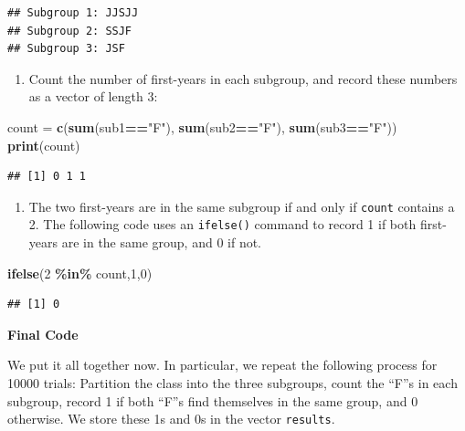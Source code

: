 \documentclass[
]{book}
\newenvironment{Shaded}{\begin{snugshade}}{\end{snugshade}}
\newcommand{\DecValTok}[1]{\textcolor[rgb]{0.00,0.00,0.81}{#1}}
\newcommand{\FunctionTok}[1]{\textcolor[rgb]{0.13,0.29,0.53}{\textbf{#1}}}
\newcommand{\NormalTok}[1]{#1}
\newcommand{\OtherTok}[1]{\textcolor[rgb]{0.56,0.35,0.01}{#1}}
\newcommand{\SpecialCharTok}[1]{\textcolor[rgb]{0.81,0.36,0.00}{\textbf{#1}}}
\newcommand{\StringTok}[1]{\textcolor[rgb]{0.31,0.60,0.02}{#1}}
\providecommand{\tightlist}{%
  \setlength{\itemsep}{0pt}\setlength{\parskip}{0pt}}
\theoremstyle{definition}
\theoremstyle{definition}
\theoremstyle{definition}
\theoremstyle{definition}
\theoremstyle{remark}
\begin{document}
\begin{verbatim}
## Subgroup 1: JJSJJ
## Subgroup 2: SSJF
## Subgroup 3: JSF
\end{verbatim}

\begin{enumerate}
\def\labelenumi{\arabic{enumi}.}
\setcounter{enumi}{2}
\tightlist
\item
  Count the number of first-years in each subgroup, and record these numbers as a vector of length 3:
\end{enumerate}

\begin{Shaded}
\begin{Highlighting}[]
\NormalTok{count }\OtherTok{=} \FunctionTok{c}\NormalTok{(}\FunctionTok{sum}\NormalTok{(sub1}\SpecialCharTok{==}\StringTok{"F"}\NormalTok{),}
            \FunctionTok{sum}\NormalTok{(sub2}\SpecialCharTok{==}\StringTok{"F"}\NormalTok{),}
            \FunctionTok{sum}\NormalTok{(sub3}\SpecialCharTok{==}\StringTok{"F"}\NormalTok{))}
\FunctionTok{print}\NormalTok{(count)}
\end{Highlighting}
\end{Shaded}

\begin{verbatim}
## [1] 0 1 1
\end{verbatim}

\begin{enumerate}
\def\labelenumi{\arabic{enumi}.}
\setcounter{enumi}{3}
\tightlist
\item
  The two first-years are in the same subgroup if and only if \texttt{count} contains a 2. The following code uses an \texttt{ifelse()} command to record 1 if both first-years are in the same group, and 0 if not.
\end{enumerate}

\begin{Shaded}
\begin{Highlighting}[]
\FunctionTok{ifelse}\NormalTok{(}\DecValTok{2} \SpecialCharTok{\%in\%}\NormalTok{ count,}\DecValTok{1}\NormalTok{,}\DecValTok{0}\NormalTok{)}
\end{Highlighting}
\end{Shaded}

\begin{verbatim}
## [1] 0
\end{verbatim}

\textbf{Final Code}

We put it all together now. In particular, we repeat the following process for 10000 trials: Partition the class into the three subgroups, count the ``F''s in each subgroup, record 1 if both ``F''s find themselves in the same group, and 0 otherwise. We store these 1s and 0s in the vector \texttt{results}.
\end{document}
